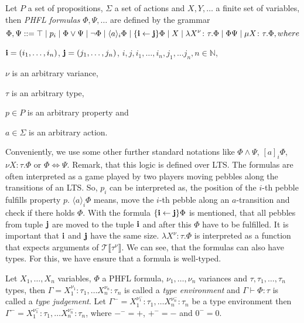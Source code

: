 \begin{definition}
    Let $P$ a set of propositions, $\Sigma$ a set of actions and $X, Y, \dots$ a finite set
    of variables, then
    \emph{PHFL formulas} $\Phi, \Psi,\dots$ are defined by the grammar
    \[\Phi,\Psi::=\top \mid p_i \mid \Phi \vee \Psi \mid \neg \Phi \mid \langle a \rangle_i \Phi \mid \{\emph{i}
    \leftarrow \emph{j}\} \Phi \mid X \mid \lambda X^\nu\colon\tau.\Phi \mid \Phi \Psi \mid \mu X\colon\tau.\Phi,
    where\]
    \begin{compactitem}
        \item $\emph{i} = (i_1,\dots, i_n)$, $\emph{j} = (j_1,\dots,j_n)$, $i, j, i_1,\dots,i_n, j_1, \dots j_n, n\in
        \mathbb{N}$,
        \item $\nu$ is an arbitrary variance,
        \item $\tau$ is an arbitrary type,
        \item $p \in P$ is an arbitrary property and
        \item $a \in \Sigma$ is an arbitrary action.
    \end{compactitem}
\end{definition}

Conveniently, we use some other further standard notations like $\Phi \wedge \Psi$, $[a]_i\Phi$, $\nu
X \colon \tau.\Phi$ or $\Phi \Leftrightarrow \Psi$. Remark, that this logic is defined over LTS. The formulas are
often interpreted as a game played by two players  moving pebbles along the transitions of an LTS. So, $p_i$ can be
interpreted as, the position of the $i$-th pebble fulfills property $p$. $\langle a \rangle_i \Phi$ means, move the
$i$-th pebble along an $a$-transition and check if there holds $\Phi$. With the formula $\{\emph{i}\leftarrow
\emph{j}\} \Phi$ is mentioned, that all pebbles from tuple $\emph{j}$ are moved to the tuple $\emph{i}$ and after
this $\Phi$ have to be fulfilled. It is important that $\emph{i}$ and $\emph{j}$ have the same size. $\lambda
X^\nu\colon\tau.\Phi$ is interpreted as a function that expects arguments of
$\mathcal{T}\llbracket\tau^\nu\rrbracket$. We can see, that the formulas can also have types. For this, we have
ensure that a formula is well-typed.

\begin{definition}
    Let $X_1, \dots, X_n$ variables, $\Phi$ a PHFL formula, $\nu_1, \dots, \nu_n$ variances and $\tau, \tau_1, \dots,
    \tau_n$ types, then $\Gamma = X_1^{\nu_1}\colon \tau_1, \dots X_n^{\nu_n} \colon \tau_n$ is
    called a \emph{type environment} and $\Gamma \vdash \Phi:\tau$
    is called a \emph{type judgement}. Let $\Gamma^- = X_1^{\nu_1^-}\colon \tau_1, \dots
    X_n^{\nu_n^-} \colon \tau_n$ be a type environment then $\Gamma^- = X_1^{\nu_1^-}\colon \tau_1, \dots
    X_n^{\nu_n^-} \colon \tau_n$, where $-^- = +$, $+^- = -$ and $0^- = 0$.
\end{definition}

